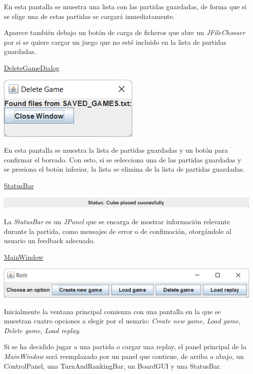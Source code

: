 \documentclass[../DocumentoOficial.tex]{subfiles}
\begin{document}
\begin{sprint}[4]
En esta pantalla se muestra una lista con las partidas guardadas, de forma que si se elige una de estas partidas se cargará inmediatamente.

Aparece también debajo un botón de carga de ficheros que abre un  \textit{JFileChooser} por si se quiere cargar un juego que no esté incluido en la lista de partidas guardadas.

\underline{DeleteGameDialog}
\begin{center}
\includegraphics[scale=0.93]{delete-dialog-sprint3.png}
\end{center}

En esta pantalla se muestra la lista de partidas guardadas y un botón para confirmar el borrado. Con esto, si se selecciona una de las partidas guardadas y se presiona el botón inferior, la lista se elimina de la lista de partidas guardadas.

\underline{StatusBar}
\begin{center}
\includegraphics[scale=0.8]{status-bar-sprint3.png}
\end{center}

La \textit{StatusBar} es un \textit{JPanel} que se encarga de mostrar información relevante durante la partida, como mensajes de error o de confimación, otorgándole al usuario un feedback adecuado.

\underline{MainWindow}
\begin{center}
\includegraphics[scale=0.8]{menu-sprint3.png}
\end{center}

Inicialmente la ventana principal comienza con una pantalla en la que se muestran cuatro opciones a elegir por el usuario: \textit{Create new game, Load game, Delete game, Load replay}.

Si se ha decidido jugar a una partida o cargar una replay, el panel principal de la \textit{MainWindow} será reemplazado por un panel que contiene, de arriba a abajo, un ControlPanel, una TurnAndRankingBar, un BoardGUI y una StatusBar.


\end{sprint}
\end{document}
